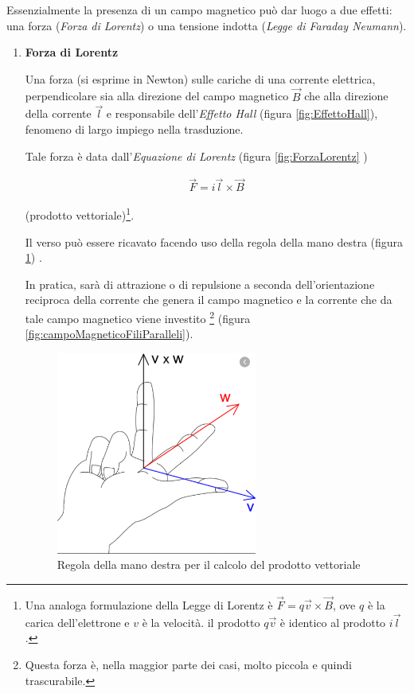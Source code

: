 \documentclass[17pt]{extarticle}
\begin{document}
Essenzialmente la presenza di un campo magnetico può dar luogo a due effetti: una forza (\emph{Forza di Lorentz}) o una tensione indotta (\emph{Legge di Faraday Neumann}).
\begin{enumerate}
	\item 
	{\bf Forza di Lorentz}
	
	
Una forza (si esprime in Newton) sulle cariche di una corrente elettrica, perpendicolare sia alla direzione del campo magnetico $\vec{B}$ che alla direzione della corrente $\vec{l}$ e responsabile dell'\emph{Effetto Hall} (figura \ref{fig:EffettoHall}), fenomeno di largo impiego nella trasduzione.


Tale forza è data dall'\emph{Equazione di Lorentz} (figura \ref{fig:ForzaLorentz} )
	
 	
\begin{eqnarray}\label{eq:Lorentz}
	 \vec{F} = i\vec{l}\times\vec{B}
\end{eqnarray}	
	
(prodotto vettoriale)\footnote{Una analoga formulazione della Legge di Lorentz è $\vec{F}= q\vec{v}\times \vec{B}$, ove $q$ è la carica dell'elettrone e $v$ è la velocità. il prodotto $q\vec{v}$ è identico al prodotto $i\vec{l}$. }. 

Il verso può essere ricavato facendo uso della regola della mano destra (figura \ref{fig:manoDestra}) .

In pratica, sarà di attrazione o di repulsione a seconda dell'orientazione reciproca della corrente che genera il campo magnetico e la corrente che da tale campo magnetico viene investito \footnote{Questa forza è, nella maggior parte dei casi, molto piccola e quindi trascurabile. } (figura \ref{fig:campoMagneticoFiliParalleli}). 


\begin{figure}[bh!]
	\centering
   	\includegraphics[width=2.6in]{regolaManoDestra.png}
  	\caption{Regola della mano destra per il calcolo del prodotto vettoriale}
   	\label{fig:manoDestra}
\end{figure}



\end{enumerate}
\end{document}

